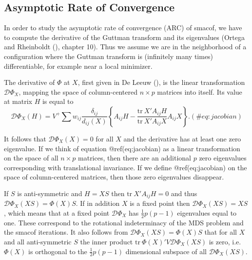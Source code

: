 \documentclass[
  12pt,
  letterpaper,
  DIV=11,
  numbers=noendperiod]{scrartcl}
\begin{document}
\subsection{Asymptotic Rate of
Convergence}\label{asymptotic-rate-of-convergence}

In order to study the asymptotic rate of convergence (ARC) of smacof, we
have to compute the derivative of the Guttman transform and its
eigenvalues (Ortega and Rheinboldt
(), chapter 10). Thus we assume
we are in the neighborhood of a configuration where the Guttman
transform is (infinitely many times) differentiable, for example near a
local minimizer.

The derivative of \(\Phi\) at \(X\), first given in De Leeuw
(), is the linear transformation
\(\mathcal{D}\Phi_X\), mapping the space of column-centered
\(n\times p\) matrices into itself. Its value at matrix \(H\) is equal
to \begin{equation}
\mathcal{D}\Phi_X(H)=V^+\sum w_{ij}\frac{\delta_{ij}}{d_{ij}(X)}\left\{A_{ij}H-\frac{\text{tr}\ X'A_{ij}H}{ \text{tr}\ X'A_{ij}X}A_{ij}X\right\}.
(\#eq:jacobian)
\end{equation}

It follows that \(\mathcal{D}\Phi_X(X)=0\) for all \(X\) and the
derivative has at least one zero eigenvalue. If we think of equation
@ref(eq:jacobian) as a linear transformation on the space of all
\(n\times p\) matrices, then there are an additional \(p\) zero
eigenvalues corresponding with translational invariance. If we define
@ref(eq:jacobian) on the space of column-centered matrices, then those
zero eigenvalues disappear.

If \(S\) is anti-symmetric and \(H=XS\) then \(\text{tr}\ X'A_{ij}H=0\)
and thus \(\mathcal{D}\Phi_X(XS)=\Phi(X)S\). If in addition \(X\) is a
fixed point then \(\mathcal{D}\Phi_X(XS)=XS\), which means that at a
fixed point \(\mathcal{D}\Phi_X\) has \(\frac12p(p-1)\) eigenvalues
equal to one. These correspond to the rotational indeterminacy of the
MDS problem and the smacof iterations. It also follows from
\(\mathcal{D}\Phi_X(XS)=\Phi(X)S\) that for all \(X\) and all
anti-symmetric \(S\) the inner product
\(\text{tr}\ \Phi(X)'V\mathcal{D}\Phi_X(XS)\) is zero, i.e.~\(\Phi(X)\)
is orthogonal to the \(\frac12 p(p-1)\) dimensional subspace of all
\(\mathcal{D}\Phi_X(XS)\).
\end{document}
